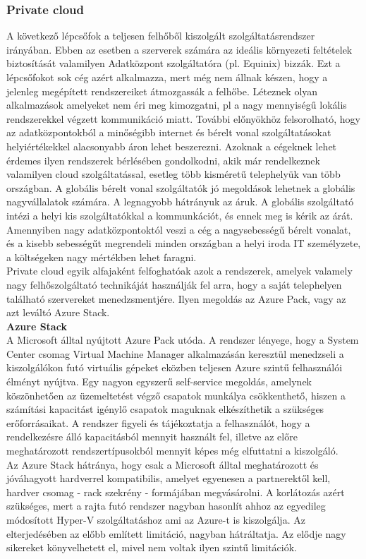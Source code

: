 \documentclass[12pt,oneside,justify,table]{book}
\begin{document}
\subsubsection{Private cloud}
A következő lépcsőfok a teljesen felhőből kiszolgált szolgáltatásrendszer irányában. Ebben az esetben a szerverek számára az ideális környezeti feltételek biztosítását valamilyen Adatközpont szolgáltatóra (pl. Equinix) bizzák. Ezt a lépcsőfokot sok cég azért alkalmazza, mert még nem állnak készen, hogy a jelenleg megépített rendszereiket átmozgassák a felhőbe. Léteznek olyan alkalmazások amelyeket nem éri meg kimozgatni, pl a nagy mennyiségű lokális rendszerekkel végzett kommunikáció miatt. További előnyökhöz felsorolható, hogy az adatközpontokból a minőségibb internet és bérelt vonal szolgáltatásokat helyiértékekkel alacsonyabb áron lehet beszerezni. Azoknak a cégeknek lehet érdemes ilyen rendszerek bérlésében gondolkodni, akik már rendelkeznek valamilyen cloud szolgáltatással, esetleg több kisméretű telephelyük van több országban. A globális bérelt vonal szolgáltatók jó megoldások lehetnek a globális nagyvállalatok számára. A legnagyobb hátrányuk az áruk. A globális szolgáltató intézi a helyi kis szolgáltatókkal a kommunkációt, és ennek meg is kérik az árát. Amennyiben nagy adatközpontoktól veszi a cég a nagysebességű bérelt vonalat, és a kisebb sebességűt megrendeli minden országban a helyi iroda IT személyzete, a költségeken nagy mértékben lehet faragni. \\
Private cloud egyik alfajaként felfoghatóak azok a rendszerek, amelyek valamely nagy felhőszolgáltató technikáját használják fel arra, hogy a saját telephelyen található szervereket menedzsmentjére. Ilyen megoldás az Azure Pack, vagy az azt leváltó Azure Stack. \\

\noindent \textbf{Azure Stack} \\
A Microsoft álltal nyújtott Azure Pack utóda. A rendszer lényege, hogy a System Center csomag Virtual Machine Manager  alkalmazásán keresztül menedzseli a kiszolgálókon futó virtuális gépeket eközben teljesen Azure szintű felhasználói élményt nyújtva. Egy nagyon egyszerű self-service megoldás, amelynek köszönhetően az üzemeltetést végző csapatok munkálya csökkenthető, hiszen a számítási kapacitást igénylő csapatok maguknak elkészíthetik a szükséges erőforrásaikat. A rendszer figyeli és tájékoztatja a felhasználót, hogy a rendelkezésre álló kapacitásból mennyit használt fel, illetve az előre meghatározott rendszertípusokból mennyit képes még elfuttatni a kiszolgáló. \\
Az Azure Stack hátránya, hogy csak a Microsoft álltal meghatározott és jóváhagyott hardverrel kompatibilis, amelyet egyenesen a partnerektől kell, hardver csomag - rack szekrény - formájában megvásárolni. A korlátozás azért szükséges, mert a rajta futó rendszer nagyban hasonlít ahhoz az egyedileg módosított Hyper-V szolgáltatáshoz ami az Azure-t is kiszolgálja. Az elterjedésében az előbb említett limitáció, nagyban hátráltatja. Az elődje nagy sikereket könyvelhetett el, mivel nem voltak ilyen szintű limitációk. 
\end{document}
